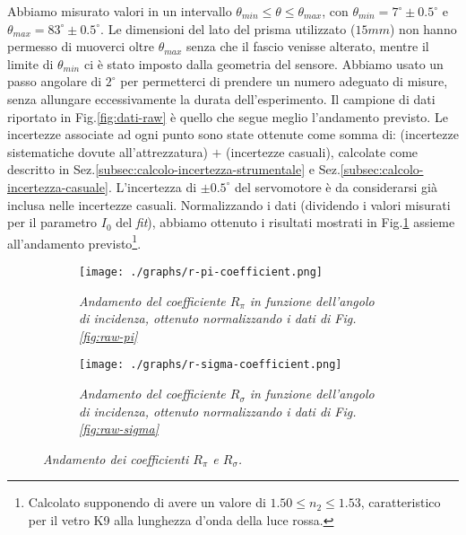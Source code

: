   Abbiamo misurato valori in un intervallo ${\theta_{min} \leq \theta \leq \theta_{max}}$,
  con ${\theta_{min} = 7^\circ \pm 0.5^\circ}$ e $\theta_{max} = 83^\circ \pm 0.5^\circ$.
  Le dimensioni del lato del prisma utilizzato ($15mm$) non hanno permesso
  di muoverci oltre $\theta_{max}$ senza che il fascio venisse alterato, mentre il
  limite di $\theta_{min}$ ci è stato imposto dalla geometria del sensore.
  Abbiamo usato un passo angolare di $2^\circ$ per permetterci di prendere un
  numero adeguato di misure, senza allungare eccessivamente la durata dell'esperimento.
  Il campione di dati riportato in Fig.\ref{fig:dati-raw} è quello che segue meglio
  l'andamento previsto.
  Le incertezze associate ad ogni punto sono state ottenute come somma di:
  (incertezze sistematiche dovute all'attrezzatura) $+$ (incertezze casuali), calcolate come
  descritto in Sez.\ref{subsec:calcolo-incertezza-strumentale} e Sez.\ref{subsec:calcolo-incertezza-casuale}. L'incertezza di $\pm 0.5^\circ$ del servomotore
  è da considerarsi già inclusa nelle incertezze casuali.
  Normalizzando i dati (dividendo i valori misurati per il parametro $I_0$ del \emph{fit}), abbiamo ottenuto i risultati mostrati in Fig.\ref{fig:normalised-coefficients}
  assieme all'andamento previsto\footnote{Calcolato supponendo di avere un valore di $1.50 \leq n_2 \leq 1.53$,
  caratteristico per il vetro K9 alla lunghezza d'onda della luce rossa.}. %
  \begin{figure}[H]
    \centering
    \begin{subfigure}[t]{.47\textwidth}
      \texttt{[image: ./graphs/r-pi-coefficient.png]}
      \caption{
        \emph{
          Andamento del coefficiente $R_\pi$ in funzione dell'angolo di incidenza, ottenuto normalizzando i dati
          di Fig.\ref{fig:raw-pi}
        }
      }
      \label{fig:normalised-coefficients}
    \end{subfigure}
    \hspace{5mm}
    \begin{subfigure}[t]{.47\textwidth}
      \texttt{[image: ./graphs/r-sigma-coefficient.png]}
      \caption{
        \emph{
          Andamento del coefficiente $R_\sigma$ in funzione dell'angolo di incidenza, ottenuto normalizzando i dati
          di Fig.\ref{fig:raw-sigma}
        }
      }
      \label{fig:coefficienti-ampiezza}
    \end{subfigure}
    \caption{
      \emph{Andamento dei coefficienti $R_\pi$ e $R_\sigma$.
      }
    }
  \end{figure}
%
